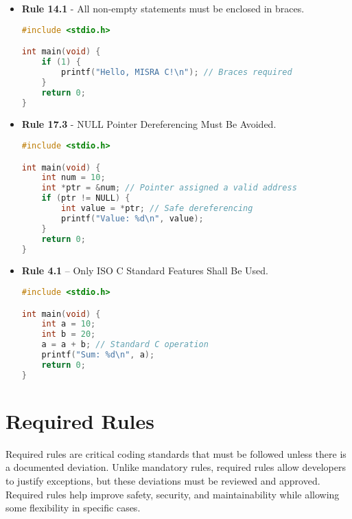 \documentclass{article}
\begin{document}
\begin{itemize}
    \item \textbf{Rule 14.1} - All non-empty statements must be enclosed in braces.

    \begin{tcolorbox}[colback=gray!10, colframe=black, sharp corners=southwest]
    \begin{lstlisting}[language=C]
#include <stdio.h>

int main(void) {
    if (1) {
        printf("Hello, MISRA C!\n"); // Braces required
    }
    return 0;
}
    \end{lstlisting}
    \end{tcolorbox}

    \item \textbf{Rule 17.3} - NULL Pointer Dereferencing Must Be Avoided.

    \begin{tcolorbox}[colback=gray!10, colframe=black, sharp corners=southwest]
    \begin{lstlisting}[language=C]
#include <stdio.h>

int main(void) {
    int num = 10;
    int *ptr = &num; // Pointer assigned a valid address
    if (ptr != NULL) {
        int value = *ptr; // Safe dereferencing
        printf("Value: %d\n", value);
    }
    return 0;
}
    \end{lstlisting}
    \end{tcolorbox}

    \item \textbf{Rule 4.1} – Only ISO C Standard Features Shall Be Used.

    \begin{tcolorbox}[colback=gray!10, colframe=black, sharp corners=southwest]
    \begin{lstlisting}[language=C]
#include <stdio.h>

int main(void) {
    int a = 10;
    int b = 20;
    a = a + b; // Standard C operation
    printf("Sum: %d\n", a);
    return 0;
}
    \end{lstlisting}
    \end{tcolorbox}
\end{itemize}

\section{Required Rules}
Required rules are critical coding standards that must be followed unless there is a documented deviation. Unlike mandatory rules, required rules allow developers to justify exceptions, but these deviations must be reviewed and approved. Required rules help improve safety, security, and maintainability while allowing some flexibility in specific cases.
\end{document}
